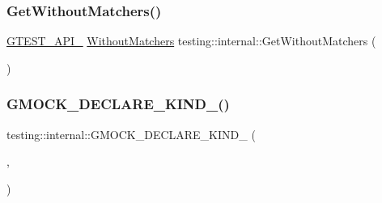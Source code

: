 \mbox{\label{namespacetesting_1_1internal_ad4e02ea077a717f95a10a03c10272f1c}} 
\subsubsection{\texorpdfstring{GetWithoutMatchers()}{GetWithoutMatchers()}}
{\footnotesize\ttfamily \mbox{\hyperlink{_obj__test_2lib_2googletest-release-1_88_81_2googletest_2include_2gtest_2internal_2gtest-port_8h_aa73be6f0ba4a7456180a94904ce17790}{G\+T\+E\+S\+T\+\_\+\+A\+P\+I\+\_\+}} \mbox{\hyperlink{classtesting_1_1internal_1_1_without_matchers}{Without\+Matchers}} testing\+::internal\+::\+Get\+Without\+Matchers (\begin{DoxyParamCaption}{ }\end{DoxyParamCaption})}

\mbox{\label{namespacetesting_1_1internal_a20f5584732e44a368e7acf295b639319}} 
\subsubsection{\texorpdfstring{GMOCK\_DECLARE\_KIND\_()}{GMOCK\_DECLARE\_KIND\_()}\hspace{0.1cm}{\footnotesize\ttfamily [1/16]}}
{\footnotesize\ttfamily testing\+::internal\+::\+G\+M\+O\+C\+K\+\_\+\+D\+E\+C\+L\+A\+R\+E\+\_\+\+K\+I\+N\+D\+\_\+ (\begin{DoxyParamCaption}\item[{bool}]{,  }\item[{\mbox{\hyperlink{namespacetesting_1_1internal_aa8747bda20137c9aa7f846dee830e686af3f53b9597c6fc6aefeece472fded3ba}{k\+Bool}}}]{ }\end{DoxyParamCaption})}

\mbox{\label{namespacetesting_1_1internal_ac8f3722ca21d8b14f86e5c949e843508}} 
